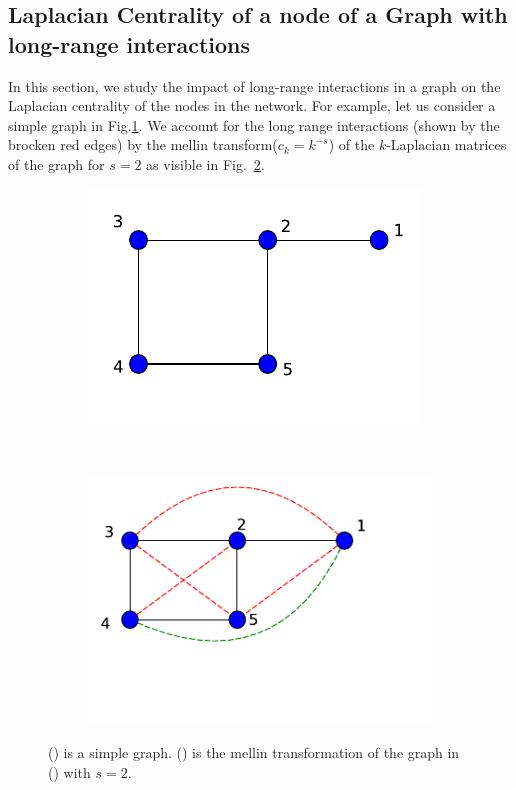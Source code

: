 \documentclass[10pt,a4paper]{article}
\begin{document}
\subsection{Laplacian Centrality of a node of a Graph with long-range interactions}
In this section, we study the impact of long-range interactions in a graph on the Laplacian centrality of the nodes in the network. For example, let us consider a simple graph in Fig.\ref{toymodel}. We account for the long range interactions (shown by the brocken red edges) by the mellin transform($c_k = k^{-s}$) of the $k$-Laplacian matrices of the graph for $s=2$ as  visible in Fig.~\ref{graph-longrange}.

\begin{figure}[!h]
	\centering
	\begin{subfigure}[b]{0.3\textwidth}
		\includegraphics[width=\textwidth]{images/kenel-toymodel.pdf}
		\caption{}
		\label{toymodel}
	\end{subfigure}~
	\begin{subfigure}[b]{0.3\textwidth}
		\includegraphics[width= \textwidth]{images/graph-longrange-demo.pdf}
		\caption{}
		\label{graph-longrange}
	\end{subfigure}
	\caption{() is a simple graph. () is the mellin transformation of the graph in () with $s=2$.   }
	\label{}
\end{figure}
\end{document}
